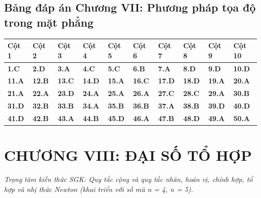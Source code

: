 \documentclass[11pt,a4paper]{article}
\begin{document}
\subsection*{\color{primary} Bảng đáp án Chương VII: Phương pháp tọa độ trong mặt phẳng}
\begin{center}
\renewcommand{\arraystretch}{1.25}
\begin{tabularx}{\textwidth}{*{10}{>{\centering\arraybackslash}X}}
\toprule
\textbf{\color{primary} Cột 1} & \textbf{\color{primary} Cột 2} & \textbf{\color{primary} Cột 3} & \textbf{\color{primary} Cột 4} & \textbf{\color{primary} Cột 5} & \textbf{\color{primary} Cột 6} & \textbf{\color{primary} Cột 7} & \textbf{\color{primary} Cột 8} & \textbf{\color{primary} Cột 9} & \textbf{\color{primary} Cột 10} \\
\midrule
\textbf{1.C} & \textbf{2.D} & \textbf{3.A} & \textbf{4.C} & \textbf{5.C} & \textbf{6.B} & \textbf{7.A} & \textbf{8.D} & \textbf{9.D} & \textbf{10.D} \\
\rowcolor{rowtint} \textbf{11.A} & \textbf{12.B} & \textbf{13.C} & \textbf{14.D} & \textbf{15.A} & \textbf{16.C} & \textbf{17.D} & \textbf{18.D} & \textbf{19.A} & \textbf{20.A} \\
\textbf{21.A} & \textbf{22.A} & \textbf{23.D} & \textbf{24.A} & \textbf{25.A} & \textbf{26.A} & \textbf{27.C} & \textbf{28.C} & \textbf{29.A} & \textbf{30.B} \\
\rowcolor{rowtint} \textbf{31.D} & \textbf{32.B} & \textbf{33.B} & \textbf{34.A} & \textbf{35.B} & \textbf{36.B} & \textbf{37.A} & \textbf{38.B} & \textbf{39.D} & \textbf{40.D} \\
\textbf{41.D} & \textbf{42.B} & \textbf{43.A} & \textbf{44.B} & \textbf{45.D} & \textbf{46.A} & \textbf{47.B} & \textbf{48.D} & \textbf{49.A} & \textbf{50.A} \\
\bottomrule
\end{tabularx}
\end{center}\vspace{10pt}
\section*{\color{primary} CHƯƠNG VIII: ĐẠI SỐ TỔ HỢP}
\textit{Trọng tâm kiến thức SGK: Quy tắc cộng và quy tắc nhân, hoán vị, chỉnh hợp, tổ hợp và nhị thức Newton (khai triển với số mũ n = 4, n = 5).}\par\vspace{4pt}
\end{document}
